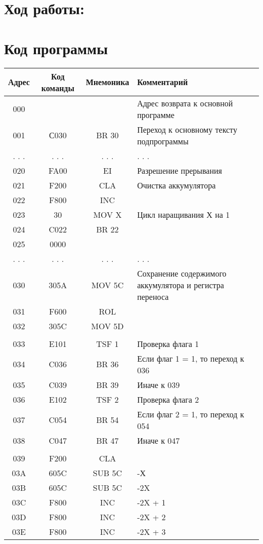 \documentclass[a4paper,14pt]{article}
\begin{document}
\section*{Ход работы:}

\section{Код программы}
\begin{tabular}{|c|c|c|l|}
\hline
\textbf{Адрес} & \textbf{Код команды} & \textbf{Мнемоника} & \textbf{Комментарий} \\\hline

    000 & & & Адрес возврата к основной программе\\
001& С030 & BR 30 & Переход к основному тексту подпрограммы\\
. . . & . . . & . . . & . . .\\
020& FA00 & EI & Разрешение прерывания\\
021& F200 & CLA & Очистка аккумулятора\\
022& F800 & INC & \\
023& 30 & MOV X & Цикл наращивания Х на 1\\
024& C022 & BR 22 & \\
025& 0000 &  & \\
. . . & . . . & . . . & . . .\\
030& 305A & MOV 5C & Сохранение содержимого аккумулятора и регистра переноса\\
031& F600 & ROL & \\
032& 305C & MOV 5D & \\
& & &\\
033& E101 & TSF 1 & Проверка флага 1\\
034& C036 & BR 36 & Если флаг 1 = 1, то переход к 036\\
035& C039 & BR 39 & Иначе к 039\\
036& E102 & TSF 2 & Проверка флага 2\\
037& C054 & BR 54 & Если флаг 2 = 1, то переход к 054\\
038& C047 & BR 47 & Иначе к 047\\
& & &\\
039& F200 & CLA & \\
03A& 605C & SUB 5C & -Х\\
03B& 605C & SUB 5C & -2X\\
03C& F800 & INC & -2X + 1\\
03D& F800 & INC & -2X + 2\\
03E& F800 & INC & -2X + 3\\

\end{tabular}
\end{document}
